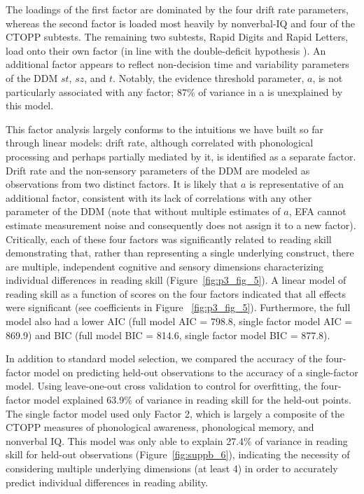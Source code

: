 \documentclass[../uwthesis.tex]{subfiles}
\begin{document}
The loadings of the first factor are dominated by the four drift rate parameters, whereas the
second factor is loaded most heavily by nonverbal-IQ and four of the CTOPP subtests. The
remaining two subtests, Rapid Digits and Rapid Letters, load onto their own factor (in line with
the double-deficit hypothesis \citep{Wolf2000Naming-speedHypothesis}). An additional factor appears to reflect non-decision time and variability parameters of the DDM $st$, $sz$, and $t$. Notably, the evidence threshold parameter, $a$, is not particularly associated with any factor; 87\% of variance in a is unexplained by this model.

This factor analysis largely conforms to the intuitions we have built so far through linear
models: drift rate, although correlated with phonological processing and perhaps partially
mediated by it, is identified as a separate factor. Drift rate and the non-sensory parameters of the
DDM are modeled as observations from two distinct factors. It is likely that $a$ is representative of
an additional factor, consistent with its lack of correlations with any other parameter of the DDM
(note that without multiple estimates of $a$, EFA cannot estimate measurement noise and
consequently does not assign it to a new factor). Critically, each of these four factors was
significantly related to reading skill demonstrating that, rather than representing a single
underlying construct, there are multiple, independent cognitive and sensory dimensions
characterizing individual differences in reading skill (Figure~\ref{fig:p3_fig_5}). A linear model of reading skill as
a function of scores on the four factors indicated that all effects were significant (see coefficients
in Figure ~\ref{fig:p3_fig_5}). Furthermore, the full model also had a lower AIC (full model AIC = 798.8, single
factor model AIC = 869.9) and BIC (full model BIC = 814.6, single factor model BIC = 877.8).

In addition to standard model selection, we compared the accuracy of the four-factor model
on predicting held-out observations to the accuracy of a single-factor model. Using leave-one-out
cross validation to control for overfitting, the four-factor model explained 63.9\% of variance in
reading skill for the held-out points. The single factor model used only Factor 2, which is largely
a composite of the CTOPP measures of phonological awareness, phonological memory, and nonverbal IQ. This model was only able to explain 27.4\% of variance in reading skill for held-out
observations (Figure~\ref{fig:suppb_6}), indicating the necessity of considering multiple underlying dimensions
(at least 4) in order to accurately predict individual differences in reading ability.
\end{document}

